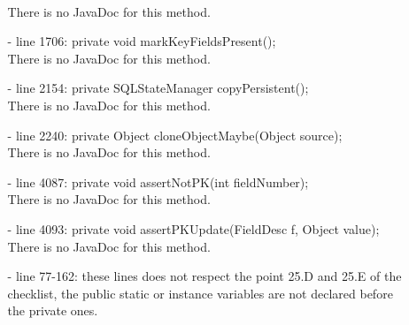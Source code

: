 \documentclass[18pt,oneside,a4paper, titlepage]{article}
\begin{document}
\begin{itemize}
\begin{itemize}
				\\There is no JavaDoc for this method.
				\item[-] line 1706: private void markKeyFieldsPresent();
				\\There is no JavaDoc for this method.
				\item[-] line 2154: private SQLStateManager copyPersistent();
				\\There is no JavaDoc for this method.
				\item[-] line 2240: private Object cloneObjectMaybe(Object source);
				\\There is no JavaDoc for this method.
				\item[-] line 4087: private void assertNotPK(int fieldNumber);
				\\There is no JavaDoc for this method.
				\item[-] line 4093: private void assertPKUpdate(FieldDesc f, Object value);
				\\There is no JavaDoc for this method.
				\item[-] line 77-162: these lines does not respect the point 25.D and 25.E of the checklist, the public static or instance variables are not declared before the private ones.
				

\end{itemize}
\end{itemize}
\end{document}
